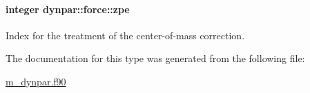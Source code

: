 \paragraph[{\texorpdfstring{zpe}{zpe}}]{\setlength{\rightskip}{0pt plus 5cm}integer dynpar\+::force\+::zpe}\hypertarget{structdynpar_1_1force_ab57b63f56eba034aa8503eb097d7962e}{}\label{structdynpar_1_1force_ab57b63f56eba034aa8503eb097d7962e}


Index for the treatment of the center-\/of-\/mass correction. 



The documentation for this type was generated from the following file\+:\begin{DoxyCompactItemize}
\item 
\hyperlink{m__dynpar_8f90}{m\+\_\+dynpar.\+f90}\end{DoxyCompactItemize}
